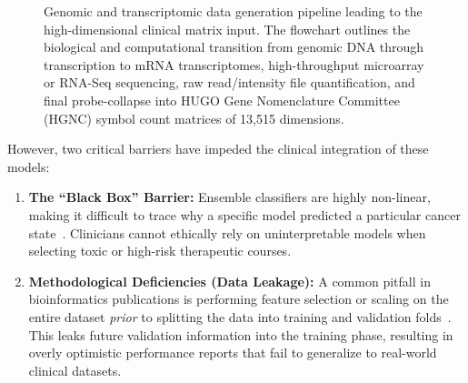 \documentclass[journal,10pt]{IEEEtran}
\begin{document}
\begin{figure}[htbp]
\centering
{}
\caption{Genomic and transcriptomic data generation pipeline leading to the high-dimensional clinical matrix input. The flowchart outlines the biological and computational transition from genomic DNA through transcription to mRNA transcriptomes, high-throughput microarray or RNA-Seq sequencing, raw read/intensity file quantification, and final probe-collapse into HUGO Gene Nomenclature Committee (HGNC) symbol count matrices of 13,515 dimensions.}
\label{fig:biological_flow}
\end{figure}

However, two critical barriers have impeded the clinical integration of these models:
\begin{enumerate}
    \item \textbf{The ``Black Box'' Barrier:} Ensemble classifiers are highly non-linear, making it difficult to trace why a specific model predicted a particular cancer state~\cite{guidotti, azodi}. Clinicians cannot ethically rely on uninterpretable models when selecting toxic or high-risk therapeutic courses.
    \item \textbf{Methodological Deficiencies (Data Leakage):} A common pitfall in bioinformatics publications is performing feature selection or scaling on the entire dataset \textit{prior} to splitting the data into training and validation folds~\cite{whalen}. This leaks future validation information into the training phase, resulting in overly optimistic performance reports that fail to generalize to real-world clinical datasets.
\end{enumerate}
\end{document}
